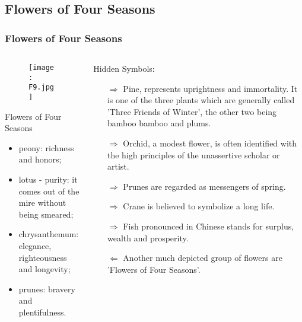 \documentclass[pdflatex,compress,8pt,
	xcolor={dvipsnames,dvipsnames,svgnames,x11names,table},
	hyperref={	
	breaklinks = true, 
	pdfauthor={Lemenkova Polina}, 
	pdfsubject={Preentation}, 
	pdfcreator={Lemenkova Polina}, 
	pdfproducer={Lemenkova Polina}, 
	colorlinks=true,
	linkcolor=NavyBlue, 
	citecolor=NavyBlue, 
	urlcolor = NavyBlue, 
	breaklinks = true}]{beamer}
\begin{document}
\subsection{Flowers of Four Seasons}
\begin{frame}\frametitle{Flowers of Four Seasons}
	\begin{minipage}[0.4\textheight]{\textwidth}
		\begin{columns}[T]
			\begin{column}{0.4\textwidth}
				\begin{figure}[H]
					\centering
					\texttt{[image: F9.jpg]}
				\end{figure}
	\small{
	\begin{block}{Flowers of Four Seasons}
\begin{itemize}
	\item \alert{peony}: richness and honors;
	\item \alert{lotus} - purity: it comes out of the mire without being smeared;
	\item \alert{chrysanthemum}: elegance, righteousness and longevity;
	\item \alert{prunes}: bravery and plentifulness.
\end{itemize}
	\end{block}
	}
			\end{column}
			\begin{column}{0.5\textwidth}
	\begin{examples}{Hidden Symbols:}\\
\begin{itemize}
	\item [$\Rightarrow$]\alert{Pine}, represents uprightness and immortality. It is one of the three plants which are generally called 'Three Friends of Winter', the other two being bamboo \alert{bamboo} and \alert{plums}.
	\item [$\Rightarrow$]\alert{Orchid}, a modest flower, is often identified with the high principles of the unassertive scholar or artist. 
	\item [$\Rightarrow$]\alert{Prunes} are regarded as messengers of spring. 
	\item [$\Rightarrow$]\alert{Crane} is believed to symbolize a long life.
	\item [$\Rightarrow$]\alert{Fish} pronounced in Chinese stands for surplus, wealth and prosperity.
	\item [$\Leftarrow$] Another much depicted group of flowers are 'Flowers of Four Seasons'.
\end{itemize}
		\end{examples}
	
			\end{column}
		\end{columns}
	\end{minipage}
\end{frame}
\end{document}
